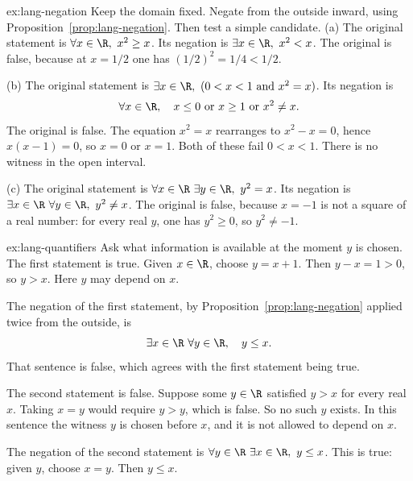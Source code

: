 \begin{solution}{ex:lang-negation}
\idea Keep the domain fixed. Negate from the outside inward, using Proposition~\ref{prop:lang-negation}. Then test a simple candidate.
\writeup (a) The original statement is $\forall x\in\R,\ x^2\ge x$. Its negation is $\exists x\in\R,\ x^2<x$. The original is false, because at $x=1/2$ one has $(1/2)^2=1/4<1/2$.

(b) The original statement is $\exists x\in\R,\ (0<x<1\ \text{and}\ x^2=x)$. Its negation is
\[
\forall x\in\R,\quad x\le 0\ \text{or}\ x\ge 1\ \text{or}\ x^2\ne x.
\]
The original is false. The equation $x^2=x$ rearranges to $x^2-x=0$, hence $x(x-1)=0$, so $x=0$ or $x=1$. Both of these fail $0<x<1$. There is no witness in the open interval.

(c) The original statement is $\forall x\in\R\ \exists y\in\R,\ y^2=x$. Its negation is $\exists x\in\R\ \forall y\in\R,\ y^2\ne x$. The original is false, because $x=-1$ is not a square of a real number: for every real $y$, one has $y^2\ge 0$, so $y^2\ne -1$.
\end{solution}

\begin{solution}{ex:lang-quantifiers}
\idea Ask what information is available at the moment $y$ is chosen.
\writeup The first statement is true. Given $x\in\R$, choose $y=x+1$. Then $y-x=1>0$, so $y>x$. Here $y$ may depend on $x$.

The negation of the first statement, by Proposition~\ref{prop:lang-negation} applied twice from the outside, is
\[
\exists x\in\R\ \forall y\in\R,\quad y\le x.
\]
That sentence is false, which agrees with the first statement being true.

The second statement is false. Suppose some $y\in\R$ satisfied $y>x$ for every real $x$. Taking $x=y$ would require $y>y$, which is false. So no such $y$ exists. In this sentence the witness $y$ is chosen before $x$, and it is not allowed to depend on $x$.

The negation of the second statement is $\forall y\in\R\ \exists x\in\R,\ y\le x$. This is true: given $y$, choose $x=y$. Then $y\le x$.
\end{solution}

